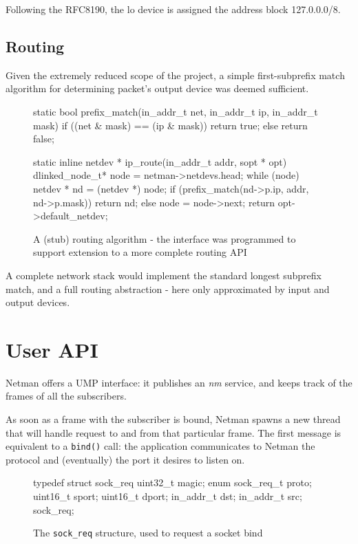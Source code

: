 \documentclass[a4paper,twoside,openright]{report}
\begin{document}
Following the RFC8190, the lo device is assigned the address block 127.0.0.0/8.


\subsection{Routing}
Given the extremely reduced scope of the project, a simple first-subprefix match algorithm for determining packet's output device was deemed sufficient.

\begin{figure} [H]
\begin{pandacode}
static bool prefix_match(in_addr_t net, in_addr_t ip, in_addr_t mask) 
	if ((net & mask) == (ip & mask))
		return true;
	else
		return false;

static inline netdev * ip_route(in_addr_t addr, sopt * opt)
	dlinked_node_t* node = netman->netdevs.head;
	while (node)
		netdev * nd = (netdev *) node;
		if (prefix_match(nd->p.ip, addr, nd->p.mask))
			return nd;
		else 
			node = node->next;
	return opt->default_netdev;
\end{pandacode}
\caption{A (stub) routing algorithm - the interface was programmed to support extension to a more complete routing API}
\end{figure}

A complete network stack would implement the standard longest subprefix match, and a full routing abstraction - here only approximated by input and output devices.

\section{User API}
Netman offers a UMP interface: it publishes an \textit{nm} service, and keeps track of the frames of all the subscribers.

As soon as a frame with the subscriber is bound, Netman spawns a new thread that will handle request to and from that particular frame. The first message is equivalent to a \texttt{bind()} call: the application communicates to Netman the protocol and (eventually) the port it desires to listen on.

\begin{figure} [H]
\begin{pandacode}
	typedef struct sock_req {
		uint32_t magic;
		enum sock_req_t proto;
		uint16_t sport;
		uint16_t dport;
		in_addr_t dst;
    in_addr_t src;
	} sock_req;
\end{pandacode}
\caption{The \texttt{sock\_req} structure, used to request a socket bind}
\end{figure}
\end{document}
